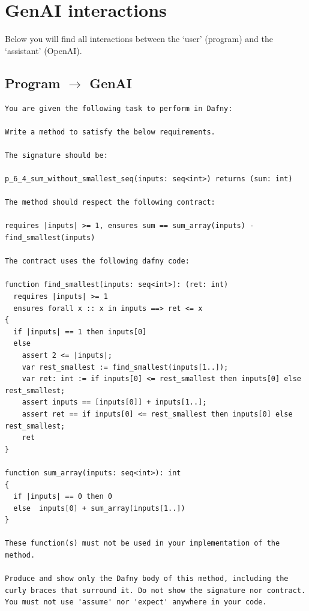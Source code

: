 \documentclass{article}
\begin{document}
\section*{GenAI interactions}
Below you will find all interactions between the `user' (program) and the `assistant' (OpenAI).
\subsection*{Program $\rightarrow$ GenAI}
\begin{lstlisting}
You are given the following task to perform in Dafny:

Write a method to satisfy the below requirements.

The signature should be:

p_6_4_sum_without_smallest_seq(inputs: seq<int>) returns (sum: int)

The method should respect the following contract:

requires |inputs| >= 1, ensures sum == sum_array(inputs) - find_smallest(inputs)

The contract uses the following dafny code:

function find_smallest(inputs: seq<int>): (ret: int)
  requires |inputs| >= 1
  ensures forall x :: x in inputs ==> ret <= x 
{
  if |inputs| == 1 then inputs[0]
  else 
    assert 2 <= |inputs|;
    var rest_smallest := find_smallest(inputs[1..]);
    var ret: int := if inputs[0] <= rest_smallest then inputs[0] else rest_smallest;
    assert inputs == [inputs[0]] + inputs[1..]; 
    assert ret == if inputs[0] <= rest_smallest then inputs[0] else rest_smallest;
    ret 
}

function sum_array(inputs: seq<int>): int
{
  if |inputs| == 0 then 0
  else  inputs[0] + sum_array(inputs[1..])
}

These function(s) must not be used in your implementation of the method.

Produce and show only the Dafny body of this method, including the curly braces that surround it. Do not show the signature nor contract. You must not use 'assume' nor 'expect' anywhere in your code.
\end{lstlisting}
\end{document}
